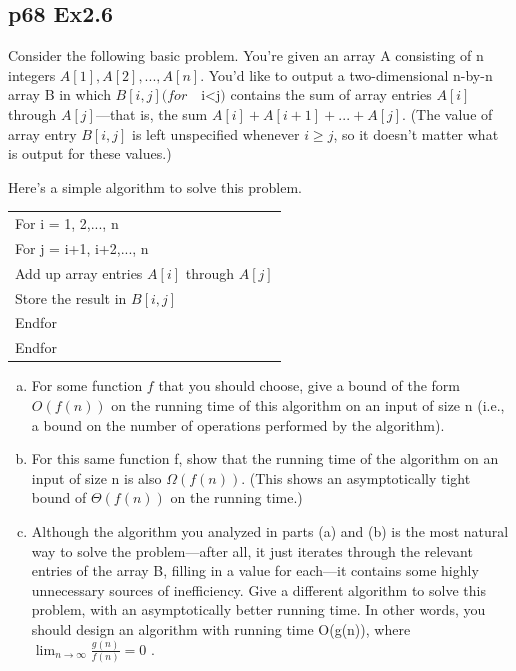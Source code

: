 \documentclass[a4paper]{article}
\begin{document}
\subsection*{p68 Ex2.6}
\begin{adjustwidth}{1cm}{1cm}
	Consider the following basic problem. You’re given an array A consisting of n integers $A[1], A[2], . . . , A[n]$. You’d like to output a two-dimensional n-by-n array B in which $B[i, j] (for\quad $i<j$)$ contains the sum of array entries $A[i]$ through $A[j]$—that is, the sum $A[i]+ A[i + 1]+ . . .+ A[j]$. (The value of array entry $B[i, j]$ is left unspecified whenever $i \geq j$, so it doesn’t matter what is output for these values.)
	\par Here’s a simple algorithm to solve this problem.
	\begin{table}[!htbp]
		\centering
		\begin{tabular}{l}
			\hline  %
			For i = 1, 2,..., n                               \\
			\quad For j = i+1, i+2,..., n                     \\
			\qquad Add up array entries $A[i]$ through $A[j]$ \\
			\qquad  Store the result in $B[i,j]$              \\
			\quad Endfor                                      \\
			Endfor                                            \\
			\hline %
		\end{tabular}
	\end{table}

	\begin{enumerate}[(a)]
		\item For some function $f$ that you should choose, give a bound of the
		      form $O(f (n))$ on the running time of this algorithm on an input of
		      size n (i.e., a bound on the number of operations performed by the
		      algorithm).
		\item For this same function f, show that the running time of the algorithm
		      on an input of size n is also $\Omega(f (n))$. (This shows an asymptotically
		      tight bound of $\Theta(f (n))$ on the running time.)
		\item Although the algorithm you analyzed in parts (a) and (b) is the most
		      natural way to solve the problem—after all, it just iterates through
		      the relevant entries of the array B, filling in a value for each—it contains some highly unnecessary sources of inefficiency. Give a different algorithm to solve this problem, with an asymptotically better running time. In other words, you should design an algorithm with running time O(g(n)), where ${\lim_{n \to \infty}\frac{g(n)}{f(n)} = 0}$ .
	\end{enumerate}
\end{adjustwidth}
\end{document}
